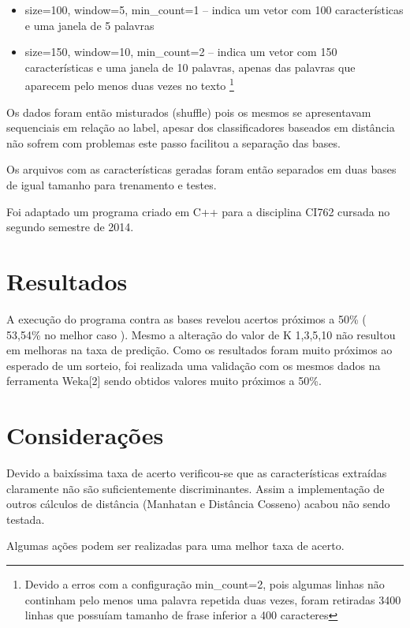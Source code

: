 \documentclass[
	article,			%
	11pt,				%
	oneside,			%
	a4paper,			%
	english,			%
	brazil,				%
	sumario=tradicional,
	fleqn				%
	]{abntex2}
\begin{document}
\begin{itemize}
	\item size=100, window=5, min\_count=1  -- indica um vetor com 100 características e uma janela de 5 palavras

    \item size=150, window=10, min\_count=2  -- indica um vetor com 150 características e uma janela de 10 palavras, apenas das palavras que aparecem pelo menos duas vezes no texto \footnote{Devido a erros com a configuração min\_count=2, pois algumas linhas não continham pelo menos uma palavra repetida duas vezes, foram retiradas 3400 linhas que possuíam tamanho de frase inferior a 400 caracteres}
\end{itemize}

Os dados foram então misturados (shuffle) pois os mesmos se apresentavam sequenciais em relação ao label, apesar dos classificadores baseados em distância não sofrem com problemas este passo facilitou a separação das bases.

Os arquivos com as características geradas foram então separados em duas bases de igual tamanho para trenamento e testes.

Foi adaptado um programa criado em C++ para a disciplina CI762 cursada no segundo semestre de 2014.

\section{Resultados}

A execução do programa contra as bases revelou acertos próximos a 50\% ( 53,54\% no melhor caso ).
Mesmo a alteração do valor de K {1,3,5,10} não resultou em melhoras na taxa de predição.
Como os resultados foram muito próximos ao esperado de um sorteio, foi realizada uma validação com os mesmos dados na ferramenta Weka[2] sendo obtidos valores muito próximos a 50\%.


\section{Considerações}

Devido a baixíssima taxa de acerto verificou-se que as características extraídas claramente não são suficientemente discriminantes.
Assim a implementação de outros cálculos de distância (Manhatan e Distância Cosseno) acabou não sendo testada.

Algumas ações podem ser realizadas para uma melhor taxa de acerto.
\end{document}
